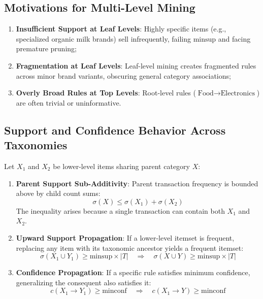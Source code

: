 \subsection{Motivations for Multi-Level Mining}
\begin{enumerate}
    \item \textbf{Insufficient Support at Leaf Levels}: Highly specific items (e.g., specialized organic milk brands) sell infrequently, failing $\mathrm{minsup}$ and facing premature pruning;
    \item \textbf{Fragmentation at Leaf Levels}: Leaf-level mining creates fragmented rules across minor brand variants, obscuring general category associations;
    \item \textbf{Overly Broad Rules at Top Levels}: Root-level rules ($\text{Food} \rightarrow \text{Electronics}$) are often trivial or uninformative.
\end{enumerate}

\subsection{Support and Confidence Behavior Across Taxonomies}
Let $X_1$ and $X_2$ be lower-level items sharing parent category $X$:
\begin{enumerate}
    \item \textbf{Parent Support Sub-Additivity}: Parent transaction frequency is bounded above by child count sums:
    \begin{equation}
    \sigma(X) \le \sigma(X_1) + \sigma(X_2)
    \end{equation}
    The inequality arises because a single transaction can contain both $X_1$ and $X_2$.
    \item \textbf{Upward Support Propagation}: If a lower-level itemset is frequent, replacing any item with its taxonomic ancestor yields a frequent itemset:
    \begin{equation}
    \sigma(X_1 \cup Y_1) \ge \mathrm{minsup} \times |T| \quad \Longrightarrow \quad \sigma(X \cup Y) \ge \mathrm{minsup} \times |T|
    \end{equation}
    \item \textbf{Confidence Propagation}: If a specific rule satisfies minimum confidence, generalizing the consequent also satisfies it:
    \begin{equation}
    c(X_1 \longrightarrow Y_1) \ge \mathrm{minconf} \quad \Longrightarrow \quad c(X_1 \longrightarrow Y) \ge \mathrm{minconf}
    \end{equation}
\end{enumerate}

